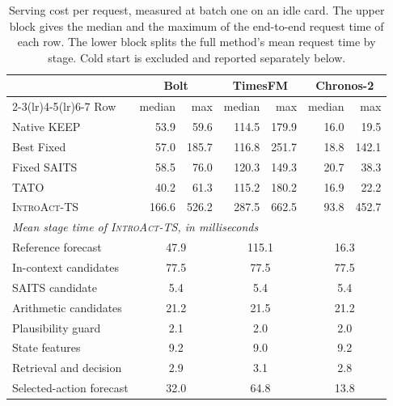 \documentclass{article}
\newcommand{\introact}{\textsc{IntroAct-TS}}
\begin{document}
\begin{table}[htbp]
  \caption{Serving cost per request, measured at batch one on an idle card. The upper block
  gives the median and the maximum of the end-to-end request time of each row. The lower block
  splits the full method's mean request time by stage. Cold start is excluded and reported
  separately below.}
  \label{tab:app-cost}
  \centering
  \small
  \setlength{\tabcolsep}{5pt}
  \begin{tabular*}{\textwidth}{@{\extracolsep{\fill}}lrrrrrr@{}}
    \toprule
    & \multicolumn{2}{c}{Bolt} & \multicolumn{2}{c}{TimesFM} & \multicolumn{2}{c}{Chronos-2} \\
    \cmidrule(lr){2-3}\cmidrule(lr){4-5}\cmidrule(lr){6-7}
    Row & median & max & median & max & median & max \\
    \midrule
    Native KEEP & 53.9 & 59.6 & 114.5 & 179.9 & 16.0 & 19.5 \\
    Best Fixed & 57.0 & 185.7 & 116.8 & 251.7 & 18.8 & 142.1 \\
    Fixed SAITS & 58.5 & 76.0 & 120.3 & 149.3 & 20.7 & 38.3 \\
    TATO & 40.2 & 61.3 & 115.2 & 180.2 & 16.9 & 22.2 \\
    \rowcolor{bestgray}\introact{} & 166.6 & 526.2 & 287.5 & 662.5 & 93.8 & 452.7 \\
    \midrule
    \multicolumn{7}{l}{\emph{Mean stage time of \introact{}, in milliseconds}} \\
    Reference forecast & \multicolumn{2}{c}{47.9} & \multicolumn{2}{c}{115.1} & \multicolumn{2}{c}{16.3} \\
    In-context candidates & \multicolumn{2}{c}{77.5} & \multicolumn{2}{c}{77.5} & \multicolumn{2}{c}{77.5} \\
    SAITS candidate & \multicolumn{2}{c}{5.4} & \multicolumn{2}{c}{5.4} & \multicolumn{2}{c}{5.4} \\
    Arithmetic candidates & \multicolumn{2}{c}{21.2} & \multicolumn{2}{c}{21.5} & \multicolumn{2}{c}{21.2} \\
    Plausibility guard & \multicolumn{2}{c}{2.1} & \multicolumn{2}{c}{2.0} & \multicolumn{2}{c}{2.0} \\
    State features & \multicolumn{2}{c}{9.2} & \multicolumn{2}{c}{9.0} & \multicolumn{2}{c}{9.2} \\
    Retrieval and decision & \multicolumn{2}{c}{2.9} & \multicolumn{2}{c}{3.1} & \multicolumn{2}{c}{2.8} \\
    Selected-action forecast & \multicolumn{2}{c}{32.0} & \multicolumn{2}{c}{64.8} & \multicolumn{2}{c}{13.8} \\
    \bottomrule
  \end{tabular*}
\end{table}
\end{document}

